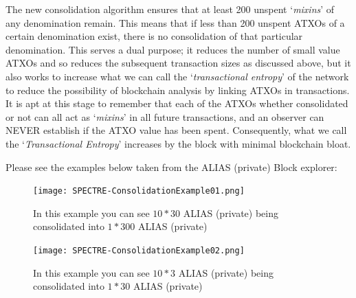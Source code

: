 \noindent
The new consolidation algorithm ensures that at least 200 unspent
‘\textit{mixins}’ of any denomination remain. This means that if less
than 200 unspent ATXOs of a certain denomination exist, there is no
consolidation of that particular denomination. This serves a dual purpose;
it reduces the number of small value ATXOs and so reduces the subsequent
transaction sizes as discussed above, but it also works to increase what
we can call the ‘\textit{transactional entropy}’ of the network to reduce
the possibility of blockchain analysis by linking ATXOs in transactions.
It is apt at this stage to remember that each of the ATXOs whether
consolidated or not can all act as ‘\textit{mixins}’ in all future
transactions, and an observer can NEVER establish if the ATXO value has
been spent. Consequently, what we call the ‘\textit{Transactional Entropy}’
increases by the block with minimal blockchain bloat.
\newpage


\noindent
Please see the examples below taken from the ALIAS (private) Block explorer:



\begin{figure}[ht]
	\centering
	\texttt{[image: SPECTRE-ConsolidationExample01.png]}
	\caption{In this example you can see $10 * 30$ ALIAS (private) being consolidated 
	into $1 * 300$ ALIAS (private)}
\end{figure}
\begin{figure}[ht]
	\centering
	\texttt{[image: SPECTRE-ConsolidationExample02.png]}
	\caption{In this example you can see $10 * 3$ ALIAS (private) being consolidated 
	into $1 * 30$ ALIAS (private)}
\end{figure}



